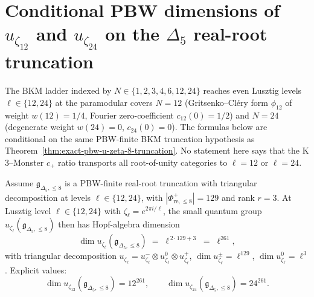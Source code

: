 \section{Conditional PBW dimensions of $u_{\zeta_{12}}$ and $u_{\zeta_{24}}$
on the $\Delta_5$ real-root truncation}
\label{sec:exact-pbw-u-zeta-12-24}

The BKM ladder indexed by $N \in \{1, 2, 3, 4, 6, 12, 24\}$ reaches
even Lusztig levels $\ell \in \{12, 24\}$ at the paramodular covers
$N = 12$ (Gritsenko--Cl\'ery form $\phi_{12}$ of weight
$w(12) = 1/4$, Fourier zero-coefficient $c_{12}(0) = 1/2$) and
$N = 24$ (degenerate weight $w(24) = 0$, $c_{24}(0) = 0$). The
formulas below are conditional on the same PBW-finite BKM
truncation hypothesis as Theorem~\ref{thm:exact-pbw-u-zeta-8-truncation}.
No statement here says that the K$3$--Monster $c_+$ ratio transports
all root-of-unity categories to $\ell=12$ or $\ell=24$.

\begin{theorem}
\label{thm:exact-pbw-u-zeta-12-24-truncation}
%
%
%
Assume $\mathfrak g_{\Delta_5,\le8}$ is a PBW-finite real-root
truncation with triangular decomposition at levels
$\ell\in\{12,24\}$, with
$|\Phi^+_{\mathrm{re}, \le 8}| = 129$ and rank $r = 3$. At Lusztig
level $\ell \in \{12, 24\}$ with $\zeta_\ell = e^{2\pi i/\ell}$, the
small quantum group $u_{\zeta_\ell}(\mathfrak g_{\Delta_5, \le 8})$
then has Hopf-algebra dimension
\begin{equation}\label{eq:exact-pbw-u-zeta-12-24-dim}
 \dim u_{\zeta_\ell}(\mathfrak g_{\Delta_5, \le 8})
 \;=\;
 \ell^{\,2\cdot 129 + 3}
 \;=\;
 \ell^{261},
\end{equation}
with triangular decomposition $u_{\zeta_\ell} = u_{\zeta_\ell}^-
\otimes u_{\zeta_\ell}^0 \otimes u_{\zeta_\ell}^+$,
$\dim u_{\zeta_\ell}^\pm = \ell^{129}$, $\dim u_{\zeta_\ell}^0 =
\ell^3$. Explicit values:
\[
 \dim u_{\zeta_{12}}(\mathfrak g_{\Delta_5, \le 8}) = 12^{261},
 \qquad
 \dim u_{\zeta_{24}}(\mathfrak g_{\Delta_5, \le 8}) = 24^{261}.
\]
\end{theorem}

